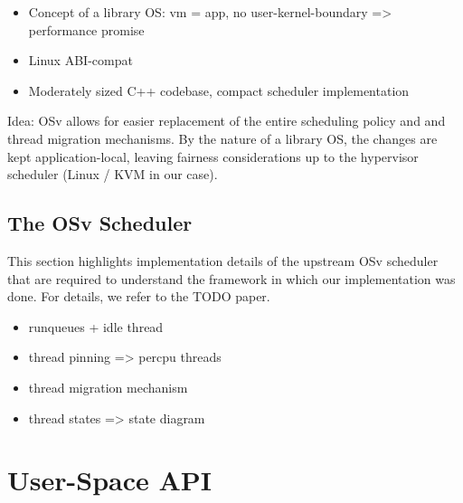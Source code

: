 \documentclass[12pt,a4paper]{book}
\begin{document}
\begin{itemize}
    \item Concept of a library OS: vm = app, no user-kernel-boundary => performance promise
    \item Linux ABI-compat
    \item Moderately sized C++ codebase, compact scheduler implementation
\end{itemize}
Idea: OSv allows for easier replacement of the entire scheduling policy and and thread migration mechanisms.
By the nature of a library OS, the changes are kept application-local, leaving fairness considerations up to the hypervisor scheduler (Linux / KVM in our case).

\subsection{The OSv Scheduler}
This section highlights implementation details of the upstream OSv scheduler that are required to understand the framework in which our implementation was done.
For details, we refer to the TODO paper.
\begin{itemize}
    \item runqueues + idle thread
    \item thread pinning => percpu threads
    \item thread migration mechanism
    \item thread states => state diagram
\end{itemize}

\section{User-Space API}\label{ch:di:api}
\blindtext
\end{document}
